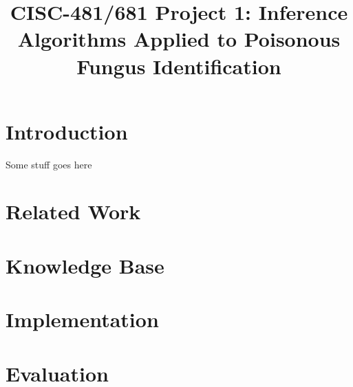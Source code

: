 \documentclass[12pt, conference, compsocconf]{IEEEtran}
\begin{document}
\title{CISC-481/681 Project 1: Inference Algorithms Applied to Poisonous Fungus Identification}

\author{ }

\maketitle

\section{Introduction}

Some stuff goes here ~\cite{russell-norvig-aima} ~\cite{python-doc} ~\cite{sympy-doc}

\section{Related Work}

\section{Knowledge Base}

\section{Implementation}

\section{Evaluation}




\end{document}
